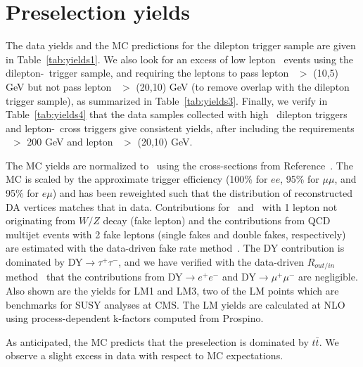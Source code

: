 \section{Preselection yields}
\label{sec:yields}

The data yields and the MC predictions for the dilepton trigger sample are given in Table~\ref{tab:yields1}.
We also look for an excess of low lepton \pt\ events using the dilepton-\Ht\ trigger sample, and
requiring the leptons to pass lepton \pt\ $>$ (10,5) GeV but not pass lepton \pt\ $>$ (20,10) GeV
(to remove overlap with the dilepton trigger sample), as summarized in Table~\ref{tab:yields3}. 
Finally, we verify in Table~\ref{tab:yields4} that the data samples collected with high \pt\ dilepton
triggers and lepton-\Ht\ cross triggers give consistent yields, after including the requirements
\Ht\ $>$ 200 GeV and lepton \pt\ $>$ (20,10) GeV.

The MC yields are normalized to \lumi\ using the cross-sections
from Reference~\cite{ref:xsec}. The MC is scaled by the approximate trigger efficiency (100\% for $ee$,
95\% for $\mu\mu$, and 95\% for $e\mu$) and has been reweighted such that the distribution of 
reconstructed DA vertices matches that in data. Contributions for \ttfake\ and \wjets\  
with 1 lepton not originating from $W/Z$ decay (fake lepton) and the contributions from QCD multijet events 
with 2 fake leptons (single fakes and double fakes, respectively) are estimated with the data-driven
fake rate method~\cite{ref:top}. 
The DY contribution is dominated by DY$\rightarrow \tau^+\tau^-$,
and we have verified with the data-driven $R_{out/in}$ method~\cite{ref:top} that the
contributions from DY$\to e^{+}e^{-}$ and DY$\to \mu^{+}\mu^{-}$ are negligible.
Also shown are the yields for LM1 and LM3, two of the LM 
points which are benchmarks for SUSY analyses at CMS. The LM yields
are calculated at NLO using process-dependent k-factors computed from Prospino.

As anticipated, the MC predicts that the preselection is dominated by $t\bar{t}$.  
We observe a slight excess in data with respect to MC expectations.

